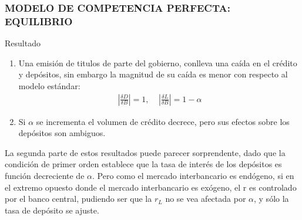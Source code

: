 \documentclass[10pt, xcolor=table, x11names]{beamer}
\begin{document}
\begin{frame}\frametitle{{\normalsize MODELO DE COMPETENCIA PERFECTA: EQUILIBRIO} {}}
    
    \begin{block} {Resultado}
        \begin{enumerate}
            \item Una emisión de titulos de parte del gobierno, conlleva una caída en el crédito y depósitos, sin embargo la magnitud de su caída es menor con respecto al modelo estándar:
            \begin{align}
            |\frac{\delta D}{\delta B}| =1,\;\;\;\; |\frac{\delta L}{\delta B}|=1-\alpha \nonumber 
            \end{align} 
            \item Si $\alpha$ se incrementa el volumen de crédito decrece, pero sus efectos sobre los depósitos son ambiguos.
        \end{enumerate}    
   
    \end{block}	 
    
     La segunda parte de estos resultados puede parecer sorprendente, dado que la condición de primer orden establece que la tasa de interés de los depósitos es función decreciente de  $\alpha$. Pero como el mercado interbancario es endógeno, si en el extremo opuesto donde el mercado interbancario es exógeno, el r es controlado por el banco central, pudiendo ser que la $r_{L}$ no se vea afectada por $\alpha$, y sólo la tasa de depósito se ajuste.  
    
\end{frame}
\end{document}
